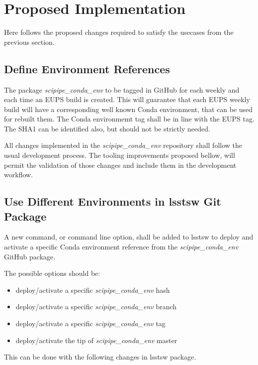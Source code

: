 \newpage
\section{Proposed Implementation} \label{sec:proposed}

Here follows the proposed changes required to satisfy the usecases from the previous section.

\subsection{Define Environment References} \label{sec:envDefine}

The package \textit{scipipe\_conda\_env} to be tagged in GitHub for each weekly and each time an EUPS build is created.
This will guarantee that each EUPS weekly build will have a corresponding well known Conda environment, that can be used for rebuilt them. 
The Conda environmemt tag shall be in line with the EUPS tag. The SHA1 can be identified also, but should not be strictly needed.

All changes implemented in the \textit{scipipe\_conda\_env} repository shall follow the usual development process.  
The tooling improvements proposed bellow, will permit the validation of those changes and include them in the development workflow.


\subsection{Use Different Environments in lsstsw Git Package} \label{sec:envActivate}

A new command, or command line option, shall be added to lsstsw to deploy and activate a specific Conda environment reference from the \textit{scipipe\_conda\_env} GitHub package.

The possible options should be:

\begin{itemize}
\item deploy/activate a specific \textit{scipipe\_conda\_env} hash
\item deploy/activate a specific \textit{scipipe\_conda\_env} branch
\item deploy/activate a specific \textit{scipipe\_conda\_env} tag
\item deploy/activate the tip of \textit{scipipe\_conda\_env} master
\end{itemize}

This can be done with the following changes in lsstsw package.


